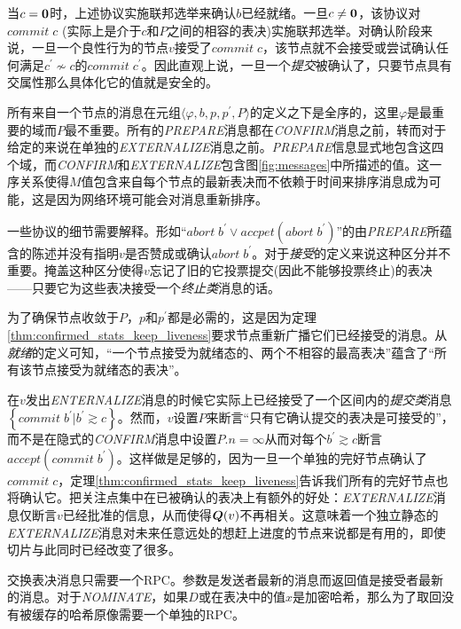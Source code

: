 当$c={\bm 0}$时，上述协议实施联邦选举来确认$b$已经就绪。一旦$c\neq {\bm 0}$，该协议对$commit\;c$ (实际上是介于$c$和$P$之间的相容的表决)实施联邦选举。对确认阶段来说，一旦一个良性行为的节点$v$接受了$commit\;c$，该节点就不会接受或尝试确认任何满足$c^{\prime}\not\sim c$的$commit\;c^{\prime}$。因此直观上说，一旦一个\textit{提交}被确认了，只要节点具有{\quorum}交属性那么具体化它的值就是安全的。

所有来自一个节点的消息在元组$\langle \varphi,b,p,p^{\prime},P\rangle$的定义之下是全序的，这里$\varphi$是最重要的域而$P$最不重要。所有的\textsl{PREPARE}消息都在\textsl{CONFIRM}消息之前，转而对于给定的{\slot}来说在单独的\textsl{EXTERNALIZE}消息之前。\textsl{PREPARE}信息显式地包含这四个域，而\textsl{CONFIRM}和\textsl{EXTERNALIZE}包含{图\ref{fig:messages}}中所描述的值。这一序关系使得$M$值包含来自每个节点的最新表决而不依赖于时间来排序消息成为可能，这是因为网络环境可能会对消息重新排序。

一些协议的细节需要解释。形如``$abort\;b^{\prime}\vee accpet(abort\;b^{\prime})$''的由\textsl{PREPARE}所蕴含的陈述并没有指明$v$是否赞成或确认$abort\;b^{\prime}$。对于\textit{接受}的定义来说这种区分并不重要。掩盖这种区分使得$v$忘记了旧的它投票提交(因此不能够投票终止)的表决——只要它为这些表决接受一个\textit{终止类}消息的话。

为了确保节点收敛于$P$，$p$和$p^{\prime}$都是必需的，这是因为定理\ref{thm:confirmed_stats_keep_liveness}要求节点重新广播它们已经接受的消息。从\textit{就绪}的定义可知，``一个节点接受为就绪态的、两个不相容的最高表决''蕴含了``所有该节点接受为就绪态的表决''。

在$v$发出\textsl{ENTERNALIZE}消息的时候它实际上已经接受了一个区间内的\textit{提交类}消息$\left\{commit\;b^{\prime}|b^{\prime}\gtrsim c\right\}$。然而，$v$设置$P$来断言``只有它确认提交的表决是可接受的''，而不是在隐式的\textsl{CONFIRM}消息中设置$P.n=\infty$从而对每个$b^{\prime}\gtrsim c$断言$accept(commit\;b^{\prime})$。这样做是足够的，因为一旦一个单独的完好节点确认了$commit\;c$，定理\ref{thm:confirmed_stats_keep_liveness}告诉我们所有的完好节点也将确认它。把关注点集中在已被确认的表决上有额外的好处：\textsl{EXTERNALIZE}消息仅断言$v$已经批准的信息，从而使得${\bm Q}(v)$不再相关。这意味着一个独立静态的\textsl{EXTERNALIZE}消息对未来任意远处的想赶上进度的节点来说都是有用的，即使{\quorum}切片与此同时已经改变了很多。

交换表决消息只需要一个RPC。参数是发送者最新的消息而返回值是接受者最新的消息。对于\textsl{NOMINATE}，如果$D$或在表决中的值$x$是加密哈希，那么为了取回没有被缓存的哈希原像需要一个单独的RPC。